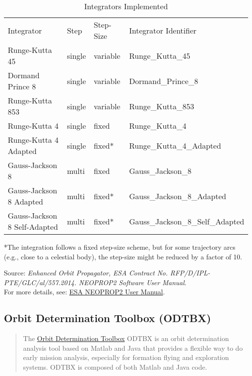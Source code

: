 \documentclass[a4paper,10pt]{article}
\begin{document}
\begin{table}[h!]
\centering
\caption{Integrators Implemented}
\begin{tabular}{llll}
Integrator             & Step & Step-Size   & Integrator Identifier \\
Runge-Kutta 45         & single            & variable    & Runge\_Kutta\_45      \\
Dormand Prince 8       & single            & variable    & Dormand\_Prince\_8    \\
Runge-Kutta 853        & single            & variable    & Runge\_Kutta\_853     \\
Runge-Kutta 4          & single            & fixed       & Runge\_Kutta\_4       \\
Runge-Kutta 4 Adapted  & single            & fixed*      & Runge\_Kutta\_4\_Adapted \\
Gauss-Jackson 8        & multi             & fixed       & Gauss\_Jackson\_8     \\
Gauss-Jackson 8 Adapted & multi            & fixed*      & Gauss\_Jackson\_8\_Adapted \\
Gauss-Jackson 8 Self-Adapted & multi      & fixed*      & Gauss\_Jackson\_8\_Self\_Adapted \\
\end{tabular}

\begin{flushleft}
*The integration follows a fixed step-size scheme, but for some trajectory arcs (e.g., close to a celestial body), the step-size might be reduced by a factor of 10.

Source: \textit{Enhanced Orbit Propagator, ESA Contract No. RFP/D/IPL-PTE/GLC/al/557.2014. NEOPROP2 Software User Manual}.\\
For more details, see: \href{https://neo.ssa.esa.int/documents/20126/418165/propagator-manual.pdf/8e36ff2a-f499-a031-77bb-0bf917810d97?t=1559724493027#page=42}{ESA NEOPROP2 User Manual}.
\end{flushleft}
\end{table}

\subsection{Orbit Determination Toolbox (ODTBX)}
\begin{quotation}
The \href{https://opensource.gsfc.nasa.gov/projects/ODTBX/}{Orbit Determination Toolbox} ODTBX is an orbit determination analysis tool based on Matlab and Java that provides a flexible way to do early mission analysis, especially for formation flying and exploration systems. ODTBX is composed of both Matlab and Java code.
\end{quotation}
\end{document}
